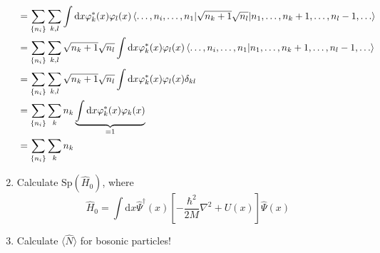 \documentclass[11pt, a4paper]{article}
\newcommand{\dd}{\mathrm{d}}
\newcommand{\Sp}[1]{\mathrm{Sp}\left({#1}\right)}
\begin{document}
\begin{enumerate}
\begin{align*}
        & = \sum\limits_{\{n_i\}}\sum\limits_{k,l}\int\dd x \varphi^*_k(x)\varphi_l(x) \braket{\dots,n_i,\dots,n_1 | 
        \sqrt{n_k+1}\sqrt{n_l} |n_1, \dots, n_k+1, \dots, n_l-1, \dots} \\
        & = \sum\limits_{\{n_i\}}\sum\limits_{k,l} \sqrt{n_k+1}\sqrt{n_l} \int\dd x \varphi^*_k(x)\varphi_l(x) \braket{\dots,n_i,\dots,n_1 |n_1, \dots, n_k+1, \dots, n_l-1, \dots} \\
        & = \sum\limits_{\{n_i\}}\sum\limits_{k,l} \sqrt{n_k+1}\sqrt{n_l} \int\dd x \varphi^*_k(x)\varphi_l(x) \delta_{kl} \\
        & = \sum\limits_{\{n_i\}}\sum\limits_{k} n_k \underbrace{\int\dd x \varphi^*_k(x)\varphi_k(x)}_{=1}\\
        & = \sum\limits_{\{n_i\}}\sum\limits_{k} n_k
    \end{align*}
    \item Calculate $\Sp {\hat H_0}$, where
    \begin{equation*}
        \hat H_0 = \int\dd x \hat\Psi^{\dagger}(x)\left[-\frac{\hbar^2}{2M}\nabla^2 + U(x) \right]\hat\Psi(x)
    \end{equation*}
    \item Calculate $\langle \hat N \rangle$ for bosonic particles!
\end{enumerate}
\end{document}
